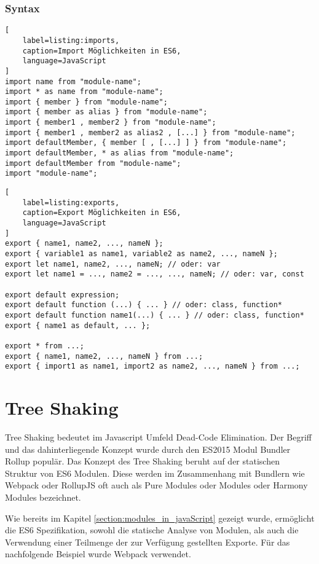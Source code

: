\subsubsection{Syntax}
\label{subsubsection:Syntax}

\begin{lstlisting}[
    label=listing:imports,
	caption=Import Möglichkeiten in ES6,
	language=JavaScript
]
import name from "module-name";
import * as name from "module-name";
import { member } from "module-name";
import { member as alias } from "module-name";
import { member1 , member2 } from "module-name";
import { member1 , member2 as alias2 , [...] } from "module-name";
import defaultMember, { member [ , [...] ] } from "module-name";
import defaultMember, * as alias from "module-name";
import defaultMember from "module-name";
import "module-name";
\end{lstlisting}

\begin{lstlisting}[
    label=listing:exports,
	caption=Export Möglichkeiten in ES6,
	language=JavaScript
]
export { name1, name2, ..., nameN };
export { variable1 as name1, variable2 as name2, ..., nameN };
export let name1, name2, ..., nameN; // oder: var
export let name1 = ..., name2 = ..., ..., nameN; // oder: var, const

export default expression;
export default function (...) { ... } // oder: class, function*
export default function name1(...) { ... } // oder: class, function*
export { name1 as default, ... };

export * from ...;
export { name1, name2, ..., nameN } from ...;
export { import1 as name1, import2 as name2, ..., nameN } from ...;
\end{lstlisting}


\section{Tree Shaking}

Tree Shaking bedeutet im Javascript Umfeld Dead-Code Elimination. Der Begriff und das dahinterliegende Konzept wurde durch den ES2015 Modul Bundler Rollup populär. Das Konzept des Tree Shaking beruht auf der statischen Struktur von ES6 Modulen. Diese werden im Zusammenhang mit Bundlern wie Webpack oder RollupJS oft auch als Pure Modules oder Modules oder Harmony Modules bezeichnet. \autocite{WebpackTreeShaking}

Wie bereits im Kapitel \ref{section:modules_in_javaScript} gezeigt wurde, ermöglicht die ES6 Spezifikation, sowohl die statische Analyse von Modulen, als auch die Verwendung einer Teilmenge der zur Verfügung gestellten Exporte.
Für das nachfolgende Beispiel wurde Webpack verwendet.

